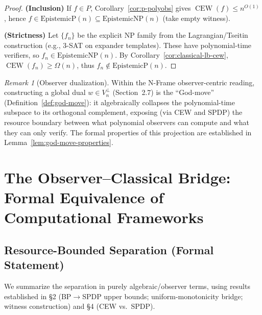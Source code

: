 \documentclass[12pt]{article}
\theoremstyle{definition}
\theoremstyle{definition}
\theoremstyle{remark}
\newtheorem{remark}{Remark}
\theoremstyle{remark}
\begin{document}
\begin{proof}
\textbf{(Inclusion)} If $f\in P$, Corollary~\ref{cor:p-polyobs} gives $\operatorname{CEW}(f)\le n^{O(1)}$, hence $f\in\mathrm{EpistemicP}(n)\subseteq\mathrm{EpistemicNP}(n)$ (take empty witness).

\textbf{(Strictness)} Let $\{f_n\}$ be the explicit NP family from the Lagrangian/Tseitin construction (e.g., 3-SAT on expander templates). These have polynomial-time verifiers, so $f_n\in\mathrm{EpistemicNP}(n)$. By Corollary~\ref{cor:classical-lb-cew}, $\operatorname{CEW}(f_n)\ge\Omega(n)$, thus $f_n\notin\mathrm{EpistemicP}(n)$.
\end{proof}

\begin{remark}[Observer dualization]
Within the N-Frame observer-centric reading, constructing a global dual $w\in V_n^{\perp}$ (Section~2.7) is the ``God-move'' (Definition~\ref{def:god-move}): it algebraically collapses the polynomial-time subspace to its orthogonal complement, exposing (via CEW and SPDP) the resource boundary between what polynomial observers can compute and what they can only verify. The formal properties of this projection are established in Lemma~\ref{lem:god-move-properties}.
\end{remark}

\section{The Observer--Classical Bridge: Formal Equivalence of Computational Frameworks}
\label{sec:enhanced}

\subsection{Resource-Bounded Separation (Formal Statement)}

We summarize the separation in purely algebraic/observer terms, using results established in \S2 (BP$\to$SPDP upper bounds; uniform-monotonicity bridge; witness construction) and \S4 (CEW vs.\ SPDP).
\end{document}
